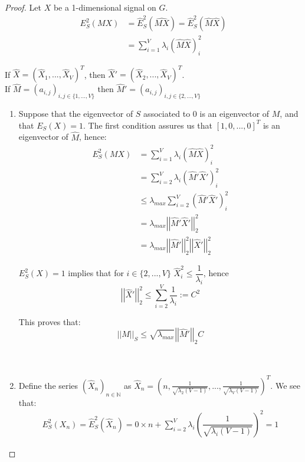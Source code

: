 \documentclass[12pt]{article}
\begin{document}
\begin{proof}
    Let $X$ be a 1-dimensional signal on $G$.
    \begin{align*}
            E^2_S(MX) &= \widehat{E}^2_S(\widehat{MX}) = \widehat{E}^2_S(\widehat{M}\widehat{X}) \\
            &= \sum_{i=1}^V \lambda_i (\widehat{M}\widehat{X})_i^2
    \end{align*}

    If $\widehat{X} = (\widehat{X}_1,...,\widehat{X}_V)^T$, then $\widehat{X}' = (\widehat{X}_2,...,\widehat{X}_V)^T$.\\

    If $\widehat{M} = (a_{i,j})_{i,j \in \{1,...,V\}}$ then $\widehat{M}' = (a_{i,j})_{i,j \in \{2,...,V\}}$
    \begin{enumerate}
        \item Suppose that the eigenvector of $S$ associated to 0 is an eigenvector of $M$, and that $E_S(X) = 1$. The first condition assures us that $[1,0,...,0]^T$ is an eigenvector of $\widehat{M}$, hence:
        \begin{align*}
            E^2_S(MX) &= \sum_{i=1}^V \lambda_i (\widehat{M} \widehat{X})_i^2 \\
                    &= \sum_{i=2}^V \lambda_i (\widehat{M}' \widehat{X}')_i^2 \\
                    &\leq \lambda_{max} \sum_{i=2}^V (\widehat{M}' \widehat{X}')_i^2 \\
                    &= \lambda_{max} \left| \left| \widehat{M}' \widehat{X}' \right| \right|^2_2 \\
                    &= \lambda_{max} \left| \left| \widehat{M}' \right| \right|^2_2 \left| \left| \widehat{X}' \right| \right|^2_2
        \end{align*}

        $E^2_S(X) = 1$ implies that for $i \in \{2,...,V\}$ $\widehat{X}_i^2 \leq \dfrac{1}{\lambda_i}$, hence $$\left| \left| \widehat{X}' \right| \right|^2_2 \leq \sum_{i=2}^V \frac{1}{\lambda_i} := C^2$$

        This proves that:
        $$
            \left| \left| M \right| \right|_S \leq \sqrt{\lambda_{max}} \left| \left| \widehat{M}' \right| \right|_2 C
        $$
        \\\\
        \item Define the series $(\widehat{X}_n)_{n \in \mathbb{N}}$ as $\widehat{X}_n = \left(n, \frac{1}{\sqrt{\lambda_2(V-1)}}, ..., \frac{1}{\sqrt{\lambda_V(V-1)}} \right)^T$. We see that:
        \begin{align*}
            E^2_S(X_n) = \widehat{E}^2_S(\widehat{X}_n) = 0\times n + \sum_{i=2}^V \lambda_i \left( \dfrac{1}{\sqrt{\lambda_i (V-1)}}\right)^2 = 1
        \end{align*}


\end{enumerate}
\end{proof}
\end{document}
